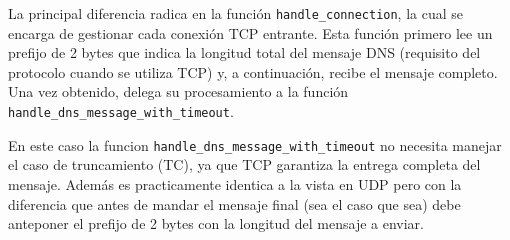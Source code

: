 La principal diferencia radica en la función \texttt{handle\_connection}, la cual se encarga de gestionar cada conexión TCP entrante. Esta función primero lee un prefijo de 2 bytes que indica
la longitud total del mensaje DNS (requisito del protocolo cuando se utiliza TCP) y, a continuación, recibe el mensaje completo. Una vez obtenido, delega su procesamiento a la función 
\texttt{handle\_dns\_message\_with\_timeout}.

En este caso la funcion \texttt{handle\_dns\_message\_with\_timeout} no necesita manejar el caso de truncamiento (TC), ya que TCP garantiza la entrega completa del mensaje. Además es 
practicamente identica a la vista en UDP pero con la diferencia que antes de mandar el mensaje final (sea el caso que sea) debe anteponer el prefijo de 2 bytes con la longitud del mensaje a enviar.
